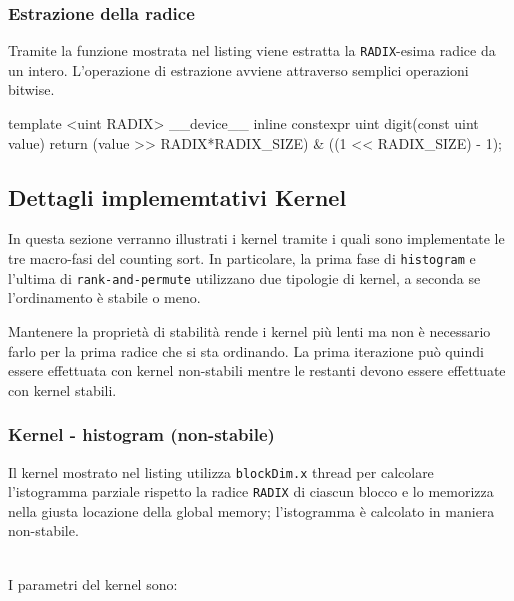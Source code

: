 \subsubsection{Estrazione della radice}
Tramite la funzione  mostrata nel listing  viene estratta la \texttt{RADIX}-esima radice da un intero. L'operazione di estrazione avviene attraverso semplici operazioni bitwise.
\begin{cpp}[caption={%
		Estratto del codice della procedura partial di ordinamento.
		\texttt{RADIX\_SIZE} è $b$. 
	},%
	label={digit-code}, captionpos=t]
template <uint RADIX>
__device__ inline constexpr uint digit(const uint value){
	return (value >> RADIX*RADIX_SIZE) & ((1 << RADIX_SIZE) - 1);
}
\end{cpp}


\subsection{Dettagli implememtativi Kernel}
In questa sezione verranno illustrati i kernel tramite i quali sono implementate le tre macro-fasi del counting sort. In particolare, la prima fase di \texttt{histogram} e l'ultima di \texttt{rank-and-permute} utilizzano due tipologie di kernel, a seconda se l'ordinamento è stabile o meno.

Mantenere la proprietà di stabilità rende i kernel più lenti ma non è necessario farlo per la prima radice che si sta ordinando. La prima iterazione può quindi essere effettuata con kernel non-stabili mentre le restanti devono essere effettuate con kernel stabili.


\subsubsection{Kernel - {histogram} (non-stabile)}
Il kernel  mostrato nel listing  utilizza \texttt{blockDim.x} thread per calcolare l'istogramma parziale rispetto la radice \texttt{RADIX} di ciascun blocco e lo memorizza nella giusta locazione della global memory; l'{}istogramma è calcolato in maniera non-stabile.

\medskip
\noindent
\textbf{\color{black!65!white}\small{}}\\
I parametri del kernel sono:

